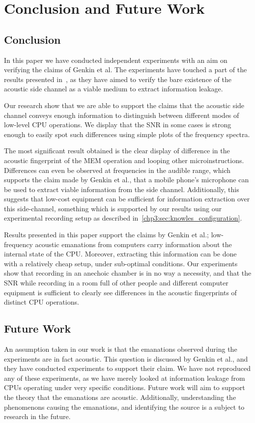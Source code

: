 \chapter{Conclusion and Future Work}\label{chp7:conclusion}

\section{Conclusion}
In this paper we have conducted independent experiments with an aim on verifying the claims of Genkin et al. 
The experiments have touched a part of the results presented in~\cite{DBLP:conf/crypto/GenkinST14}, as they have aimed to verify the bare existence of the acoustic side channel as a viable medium to extract information leakage.

Our research show that we are able to support the claims that the acoustic side channel conveys enough information to distinguish between different modes of low-level CPU operations.
We display that the \gls{SNR} in some cases is strong enough to easily spot such differences using simple plots of the frequency spectra.

The most significant result obtained is the clear display of difference in the acoustic fingerprint of the MEM operation and looping other microinstructions.
Differences can even be observed at frequencies in the audible range, which supports the claim made by Genkin et al., that a mobile phone's microphone can be used to extract viable information from the side channel.
Additionally, this suggests that low-cost equipment can be sufficient for information extraction over this side-channel, something which is supported by our results using our experimental recording setup as described in~\autoref{chp3:sec:knowles_configuration}.

Results presented in this paper support the claims by Genkin et al.; low-frequency acoustic emanations from computers carry information about the internal state of the \gls{CPU}.
Moreover, extracting this information can be done with a relatively cheap setup, under sub-optimal conditions.
Our experiments show that recording in an anechoic chamber is in no way a necessity, and that the \gls{SNR} while recording in a room full of other people and different computer equipment is sufficient to clearly see differences in the acoustic fingerprints of distinct \gls{CPU} operations.



\section{Future Work}\label{chp7:sec:future_work}
An assumption taken in our work is that the emanations observed during the experiments are in fact acoustic.
This question is discussed by Genkin et al., and they have conducted experiments to support their claim.
We have not reproduced any of these experiments, as we have merely looked at information leakage from CPUs operating under very specific conditions.
Future work will aim to support the theory that the emanations are acoustic.
Additionally, understanding the phenomenons causing the emanations, and identifying the source is a subject to research in the future.




